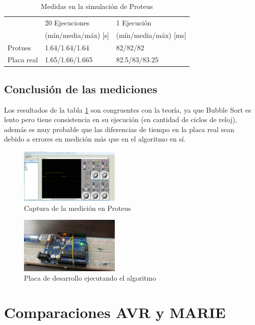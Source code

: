 \documentclass[letterpaper, 10 pt, conference]{ieeeconf}  %
\begin{document}
\begin{table}[H]
  \centering
  \begin{tabular}{|l|l|l|}
    \hline
                & 20 Ejecuciones        & 1 Ejecución           \\
                & (mín/media/máx) [s]   & (mín/media/máx) [ms]  \\ \hline
    Protues     & 1.64/1.64/1.64        & 82/82/82              \\ \hline
    Placa real  & 1.65/1.66/1.665       & 82.5/83/83.25         \\ \hline
  \end{tabular}
  \caption{Medidas en la simulación de Proteus}
  \label{tab:mediciones_proteus}
\end{table}

\subsection{Conclusión de las mediciones}
Los resultados de la tabla \ref{tab:mediciones_proteus} son congruentes con la teoría, ya que Bubble Sort es lento pero tiene consistencia en su ejecución (en cantidad de ciclos de reloj), además es muy probable que las diferencias de tiempo en la placa real sean debido a errores en medición más que en el algoritmo en sí.

\begin{figure}[H]
  \centering
  \includegraphics[width=0.43\textwidth]{./proteus_captura.png}
  \caption{Captura de la medición en Proteus}
  \label{fig:proteus_captura}
\end{figure}

\begin{figure}[H]
  \centering
  \includegraphics[width=0.43\textwidth]{./placa_real.jpeg}
  \caption{Placa de desarrollo ejecutando el algoritmo}
  \label{fig:placa_real}
\end{figure}

\section{Comparaciones AVR y MARIE}
\end{document}
